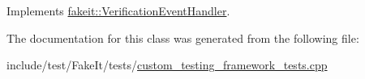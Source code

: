 Implements \mbox{\hyperlink{structfakeit_1_1VerificationEventHandler_a826b9d15e23bad7013b219d8e45ef1d0}{fakeit\+::\+Verification\+Event\+Handler}}.



The documentation for this class was generated from the following file\+:\begin{DoxyCompactItemize}
\item 
include/test/\+Fake\+It/tests/\mbox{\hyperlink{custom__testing__framework__tests_8cpp}{custom\+\_\+testing\+\_\+framework\+\_\+tests.\+cpp}}\end{DoxyCompactItemize}
